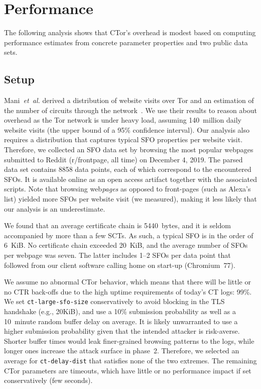 %
%
\section{Performance} \label{sec:performance}
The following analysis shows that CTor's overhead is modest based on computing
performance estimates from concrete parameter properties and two public data
sets.

\subsection{Setup}
Mani~\emph{et~al.} derived a distribution of website visits over Tor and an
estimation of the number of circuits through the network~\cite{mani}.  We use
their results to reason about overhead as the Tor network is under heavy load,
assuming 140~million daily website visits (the upper bound of a 95\% confidence
interval).  Our analysis also requires a distribution that captures typical SFO
properties per website visit.  Therefore, we collected an SFO data set by
browsing the most popular webpages submitted to Reddit (r/frontpage, all time)
on December 4, 2019.  The parsed data set contains 8858 data points, each of
which correspond to the encountered SFOs.  It is available online as an open
access artifact together with the associated scripts.  Note that browsing
web\emph{pages} as opposed to front-pages (such as Alexa's list) yielded more
SFOs per website visit (we measured), making it less likely that our analysis is
an underestimate.

We found that an average certificate chain is 5440~bytes, and it is seldom
accompanied by more than a few SCTs.  As such, a typical SFO is in the order of
6~KiB.  No certificate chain exceeded 20~KiB, and the average number of SFOs per
webpage was seven.  The latter includes 1--2 SFOs per data point that followed
from our client software calling home on start-up (Chromium~77).

We assume no abnormal CTor behavior, which means that there will be little or
no CTR back-offs due to the high uptime requirements of today's CT logs: 99\%.
We set \texttt{ct-large-sfo-size} conservatively to avoid blocking in the TLS
handshake (e.g., 20KiB), and use a 10\% submission probability as well as a
10~minute random buffer delay on average.  It is likely unwarranted to use a
higher submission probability given that the intended attacker is risk-averse.
Shorter buffer times would leak finer-grained browsing patterns to the logs,
while longer ones increase the attack surface in phase~2.  Therefore, we
selected an average for \texttt{ct-delay-dist} that satisfies none of the two
extremes.  The remaining CTor parameters are timeouts, which have little or no
performance impact if set conservatively (few seconds).

